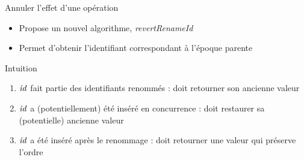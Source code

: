 \begin{frame}{Annuler l'effet d'une opération \ren}
  \begin{itemize}
    \item Propose un nouvel algorithme, \emph{revertRenameId}
    \item Permet d'obtenir l'identifiant correspondant à l'époque parente
  \end{itemize}
  \begin{block}{Intuition}
    \begin{enumerate}
      \item $\mathit{id}$ fait partie des identifiants renommés : doit retourner son ancienne valeur
      \item $\mathit{id}$ a (potentiellement) été inséré en concurrence : doit restaurer sa (potentielle) ancienne valeur
      \item $\mathit{id}$ a été inséré après le renommage : doit retourner une valeur qui préserve l'ordre
    \end{enumerate}
  \end{block}
\end{frame}

